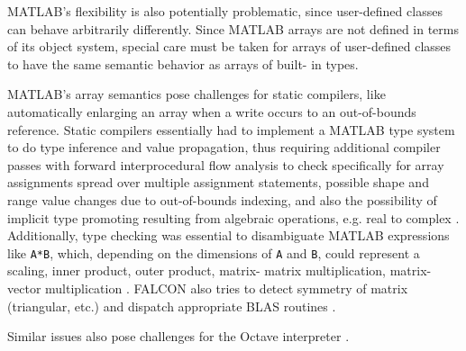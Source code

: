 \documentclass[preprint]{sigplanconf}
\newcommand{\MATLAB}{\textsc{MATLAB}}
\newcommand{\Mathematica}{\textit{Mathematica}}
\newcommand{\code}[1]{\texttt{#1}}
\begin{document}
\begin{enumerate}
\MATLAB's flexibility is also potentially problematic, since user-defined
classes can behave arbitrarily differently. Since \MATLAB{} arrays are not
defined in terms of its object system, special care must be taken for arrays
of user-defined classes to have the same semantic behavior as arrays of built-
in types.


\MATLAB's array semantics pose challenges for static compilers, like
automatically enlarging an array when a write occurs to an out-of-bounds
reference. Static compilers essentially had to implement a \MATLAB{} type
system to do type inference and value propagation, thus requiring additional
compiler passes with forward interprocedural ﬂow analysis to check
specifically for array assignments spread over multiple assignment
statements, possible shape and range value changes due to out-of-bounds
indexing, and also the possibility of implicit type promoting resulting from
algebraic operations, e.g. real to complex \cite{Rose:1999tt, Li:2013mf}.
Additionally, type checking was essential to disambiguate \MATLAB{}
expressions like \code{A*B}, which, depending on the dimensions of \code{A} and
\code{B}, could represent a scaling, inner product, outer product, matrix-
matrix multiplication, matrix-vector multiplication \cite{Rose:1999tt}. FALCON
also tries to detect symmetry of matrix (triangular, etc.) and dispatch
appropriate BLAS routines \cite{Rose:1999tt}.


Similar issues also pose challenges for the Octave interpreter \cite{Eaton:2001op}.

%


\end{enumerate}
\end{document}
